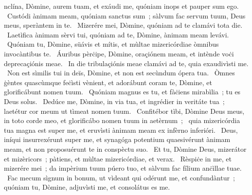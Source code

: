 { }
{%
nclína, Dòmine, aurem tuam, et exáudi me, quóniam inops et pauper sum ego. 
~Custódi ànimam meam, quóniam sanctus sum~; sàlvum fac servum tuum, Deus meus, speràntem in te. 
~Mizerére mei, Dòmine, quóniam ad te clamávi tota die. 
~Laetìfica ànimam sèrvi tui, quóniam ad te, Dòmine, ànimam meam levávi. 
~Quóniam tu, Dòmine, süávis et mítis, et mùltae mizericórdiae òmnibus invocàntibus te. 
~Áuribus pèrċipe, Dòmine, oraçiónem meam, et intènde voċi deprecaçiónis meae. 
~In die tribulaçiónis meae clamávi ad te, quia exaudivìsti me. 
~Non est sìmilis tui in deïs, Dòmine, et non est secùndum ópera tua. 
~Òmnes ġèntes quascùmque feċìsti vènient, et adorábunt coram te, Dòmine, et glorificábunt nomen tuum. 
~Quóniam magnus es tu, et fàċiens mirabìlia~; tu es Deus solus. 
~Dedúce me, Dòmine, in via tua, et ingrédier in veritáte tua~; laetétur cor meum ut tìmeat nomen tuum. 
~Confitébor tìbi, Dòmine Deus meus, in toto corde meo, et glorificábo nomen tuum in aetèrnum~; 
~quia mizericórdia tua magna est super me, et eruvìsti ànimam meam ex infèrno inferióri. 
~Deus, iníqui insurrexérunt super me, et synagóga potentium quaesivérunt ànimam meam, et non proposuérunt te in conspèctu suo. 
~Et tu, Dòmine Deus, mizerátor et mizèricors~; pàtiens, et mùltae mizericórdiae, et verax. 
~Rèspiċe in me, et mizerére mei~; da impèrium tuum púero tuo, et sàlvum fac fílium anċìllae tuae. 
~Fac mecum sìgnum in bonum, ut vìdeant qui odérunt me, et confundàntur~; quóniam tu, Dòmine, adjuvìsti me, et consolátus es me. 
}
